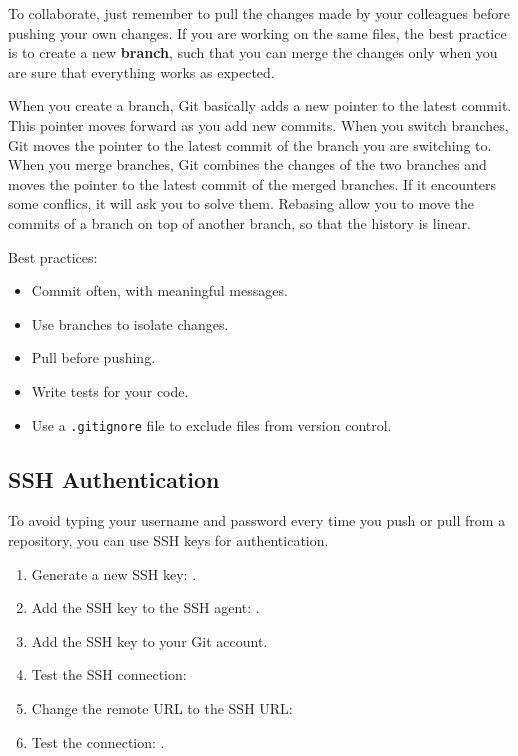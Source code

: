 To collaborate, just remember to pull the changes made by your colleagues before pushing your own changes. If you are working on the same files, the best practice is to create a new \textbf{branch},
such that you can merge the changes only when you are sure that everything works as expected.

When you create a branch, Git basically adds a new pointer to the latest commit. This pointer moves forward as you add new commits. 
When you switch branches, Git moves the pointer to the latest commit of the branch you are switching to.
When you merge branches, Git combines the changes of the two branches and moves the pointer to the latest commit of the merged branches. If it encounters some conflics, it will ask you to solve them.
Rebasing allow you to move the commits of a branch on top of another branch, so that the history is linear.

Best practices:
\begin{itemize}
    \item Commit often, with meaningful messages.
    \item Use branches to isolate changes.
    \item Pull before pushing.
    \item Write tests for your code.
    \item Use a \texttt{.gitignore} file to exclude files from version control.
\end{itemize}

\subsection{SSH Authentication}

To avoid typing your username and password every time you push or pull from a repository, you can use SSH keys for authentication.

\begin{tipsblock}
    \begin{enumerate}
        \item Generate a new SSH key: .
        \item Add the SSH key to the SSH agent: \newline {}.
        \item Add the SSH key to your Git account.
        \item Test the SSH connection: 
        \item Change the remote URL to the SSH URL: 
        \item Test the connection: .
    \end{enumerate}
\end{tipsblock}

